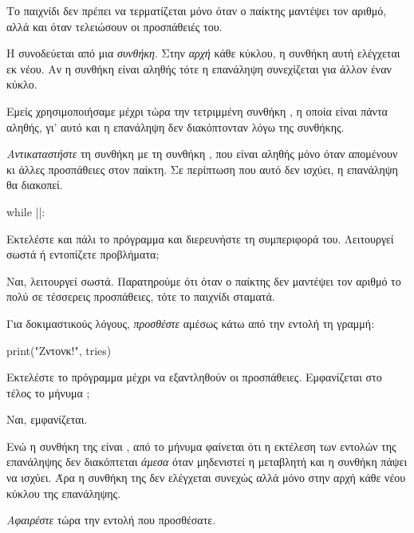 \documentclass[a4paper,11pt,oneside]{book}
\begin{document}
Το παιχνίδι δεν πρέπει να τερματίζεται μόνο όταν ο παίκτης μαντέψει τον αριθμό, αλλά και όταν τελειώσουν οι προσπάθειές του.

\begin{step}
Η  συνοδεύεται από μια \emph{συνθήκη}. Στην \emph{αρχή} κάθε κύκλου, η συνθήκη αυτή ελέγχεται εκ νέου. Αν η συνθήκη είναι αληθής τότε η επανάληψη συνεχίζεται για άλλον έναν κύκλο. 

Εμείς χρησιμοποιήσαμε μέχρι τώρα την τετριμμένη συνθήκη , η οποία είναι πάντα αληθής, γι' αυτό και η επανάληψη δεν διακόπτονταν λόγω της συνθήκης.

\emph{Αντικαταστήστε} τη συνθήκη  με τη συνθήκη , που είναι αληθής μόνο όταν απομένουν κι άλλες προσπάθειες στον παίκτη. Σε περίπτωση που αυτό δεν ισχύει, η επανάληψη θα διακοπεί.

\begin{pyplain}
while ||:
\end{pyplain}

Εκτελέστε και πάλι το πρόγραμμα και διερευνήστε τη συμπεριφορά του. Λειτουργεί σωστά ή εντοπίζετε προβλήματα;

\begin{answer}
	Ναι, λειτουργεί σωστά. Παρατηρούμε ότι όταν ο παίκτης δεν μαντέψει τον αριθμό το πολύ σε τέσσερεις προσπάθειες, τότε το παιχνίδι σταματά.
\end{answer}
\end{step}

\begin{step}
Για δοκιμαστικούς λόγους, \emph{προσθέστε} αμέσως κάτω από την εντολή  τη γραμμή:

\begin{pynew}
print("Ζντονκ!", tries)
\end{pynew}

Εκτελέστε το πρόγραμμα μέχρι να εξαντληθούν οι προσπάθειες. Eμφανίζεται στο τέλος το μήνυμα ;

\begin{answer}
	Ναι, εμφανίζεται.
\end{answer}

Ενώ η συνθήκη της  είναι , από το μήνυμα φαίνεται ότι η εκτέλεση των εντολών της επανάληψης δεν διακόπτεται \emph{άμεσα} όταν μηδενιστεί η μεταβλητή  και η συνθήκη πάψει να ισχύει. Άρα η συνθήκη  της  δεν ελέγχεται συνεχώς αλλά μόνο στην αρχή κάθε νέου κύκλου της επανάληψης.

\emph{Αφαιρέστε} τώρα την εντολή που προσθέσατε.
\end{step}
\end{document}
